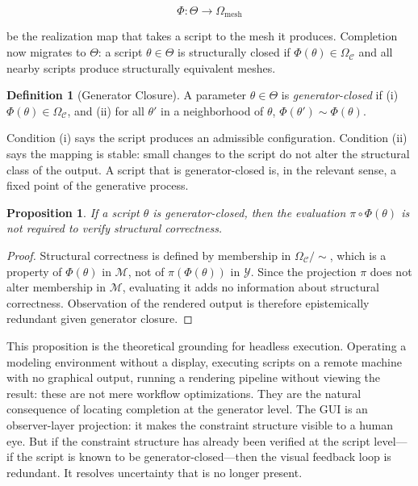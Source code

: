\documentclass[11pt, twoside]{article}
\theoremstyle{plain}
\newtheorem{proposition}[theorem]{Proposition}
\theoremstyle{definition}
\newtheorem{definition}[theorem]{Definition}
\theoremstyle{remark}
\newcommand{\OmC}{\Omega_{\mathcal{C}}}
\begin{document}
\[
\Phi : \Theta \to \Omega_{\text{mesh}}
\]

be the realization map that takes a script to the mesh it produces. Completion now migrates to $\Theta$: a script $\theta \in \Theta$ is structurally closed if $\Phi(\theta) \in \OmC$ and all nearby scripts produce structurally equivalent meshes.

\begin{definition}[Generator Closure]
\label{def:generator-closure}
A parameter $\theta \in \Theta$ is \emph{generator-closed} if (i) $\Phi(\theta) \in \OmC$, and (ii) for all $\theta'$ in a neighborhood of $\theta$, $\Phi(\theta') \sim \Phi(\theta)$.
\end{definition}

Condition (i) says the script produces an admissible configuration. Condition (ii) says the mapping is stable: small changes to the script do not alter the structural class of the output. A script that is generator-closed is, in the relevant sense, a fixed point of the generative process.

\begin{proposition}
\label{prop:headless}
If a script $\theta$ is generator-closed, then the evaluation $\pi \circ \Phi(\theta)$ is not required to verify structural correctness.
\end{proposition}

\begin{proof}
Structural correctness is defined by membership in $\OmC / {\sim}$, which is a property of $\Phi(\theta)$ in $\mathcal{M}$, not of $\pi(\Phi(\theta))$ in $\mathcal{Y}$. Since the projection $\pi$ does not alter membership in $\mathcal{M}$, evaluating it adds no information about structural correctness. Observation of the rendered output is therefore epistemically redundant given generator closure.
\end{proof}

This proposition is the theoretical grounding for headless execution. Operating a modeling environment without a display, executing scripts on a remote machine with no graphical output, running a rendering pipeline without viewing the result: these are not mere workflow optimizations. They are the natural consequence of locating completion at the generator level. The GUI is an observer-layer projection: it makes the constraint structure visible to a human eye. But if the constraint structure has already been verified at the script level---if the script is known to be generator-closed---then the visual feedback loop is redundant. It resolves uncertainty that is no longer present.
\end{document}
